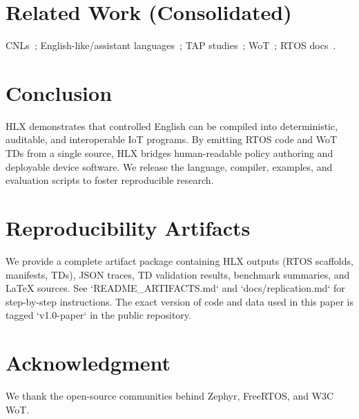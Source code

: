 \documentclass[journal]{IEEEtran}
\begin{document}
\section{Related Work (Consolidated)}
CNLs~\cite{KuhnCNL14,ACEManual}; English-like/assistant languages~\cite{InformSite,AppleScriptGuide,ThingTalk22,GeniePLDI19}; TAP studies~\cite{UrIFTTT16,BrackenburyTAP19}; WoT~\cite{WoT11}; RTOS docs~\cite{ZephyrDocs,FreeRTOSDocs}.

\section{Conclusion}
HLX demonstrates that controlled English can be compiled into deterministic, auditable, and interoperable IoT programs. By emitting RTOS code and WoT TDs from a single source, HLX bridges human-readable policy authoring and deployable device software. We release the language, compiler, examples, and evaluation scripts to foster reproducible research.

\section*{Reproducibility Artifacts}
We provide a complete artifact package containing HLX outputs (RTOS scaffolds, manifests, TDs), JSON traces, TD validation results, benchmark summaries, and LaTeX sources. See `README\_ARTIFACTS.md` and `docs/replication.md` for step-by-step instructions. The exact version of code and data used in this paper is tagged `v1.0-paper` in the public repository.

\section*{Acknowledgment}
We thank the open-source communities behind Zephyr, FreeRTOS, and W3C WoT.



\end{document}
